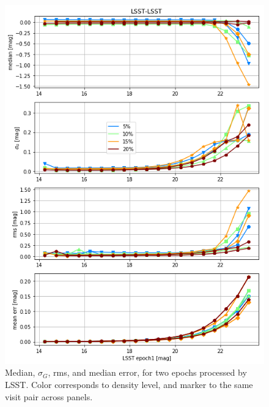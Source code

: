 \documentclass[DM,lsstdraft,toc,usenatbib]{lsstdoc}
\begin{document}


\begin{figure}
\begin{centering}
\includegraphics[width=0.8\columnwidth]{figs/20_lsst-lsst_spread_plot.png}
\caption{Median, $\sigma_{G}$,  rms, and  median error, for two epochs processed by LSST. Color corresponds to density level, and marker to the same visit pair across panels. }
\label{fig:epoch_lsst_multiplot}
\end{centering}
\end{figure} 


\end{document}
